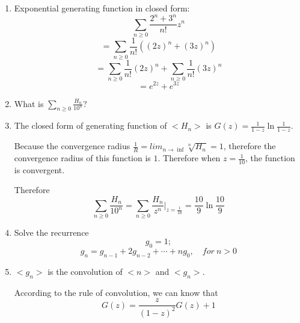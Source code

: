 \documentclass[12pt,a4paper]{ctexart}
\makeatletter
\newtheorem*{solution}{Solution}
\theoremstyle{definition}
\renewenvironment{solution}[1][Solution] {\par\pushQED{\qed}\normalfont\topsep6\p@\@plus6\p@\relax\trivlist\item[\hskip\labelsep\bfseries#1\@addpunct{.}]\ignorespaces}{\popQED\endtrivlist\@endpefalse} \makeatother
\makeatother
\begin{document}
\begin{enumerate}
\begin{solution}
        	Exponential generating function in closed form:
        	\begin{equation*}
        	    \sum_{n \ge 0} \frac{2^n+3^n}{n!} z^n
        	\end{equation*}
        	\begin{equation*}
        	    =\sum_{n \ge 0} \frac{1}{n!} ((2z)^n+(3z)^n)
        	\end{equation*}
        	\begin{equation*}
        	    =\sum_{n \ge 0} \frac{1}{n!}(2z)^n+\sum_{n \ge 0} \frac{1}{n!}(3z)^n
        	\end{equation*}
        	\begin{equation*}
        	    =e^{2z}+e^{3z}
        	\end{equation*}
        \end{solution}
    \item 
        What is $\sum_{n\ge0} \frac{H_n}{10^n}$?
        \begin{solution}
        	The closed form of generating function of $<H_n>$ is $G(z)=\frac{1}{1-z}\ln \frac{1}{1-z}$.
        	
        	Because the convergence radius $\frac{1}{R}=lim_{n \rightarrow \inf} \sqrt[n]{H_n}=1$, therefore the convergence radius of this function is $1$. Therefore when $z=\frac{1}{10}$, the function is convergent.
        	
        	Therefore
        	\begin{equation*} 
        	\sum_{n\ge0} \frac{H_n}{10^n}=\sum_{n \ge 0} \frac{H_n}{z^n}|_{z=\frac{1}{10}}=\frac{10}{9}\ln \frac{10}{9}
            \end{equation*}
        \end{solution}
    \item 
        Solve the recurrence
        \begin{equation*}
            g_0=1;
        \end{equation*}
        \begin{equation*}
            g_n=g_{n-1}+2g_{n-2}+\cdots+ng_0,\quad for\ n>0
        \end{equation*}
        \begin{solution}
            $<g_n>$ is the convolution of $<n>$ and $<g_n>$. 
            
            According to the rule of convolution, we can know that 
            \begin{equation*}
                G(z)=\frac{z}{(1-z)^2}G(z)+1
            \end{equation*}
            

\end{solution}
\end{enumerate}
\end{document}
